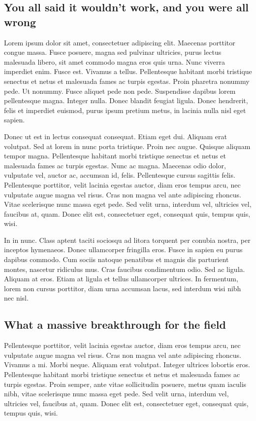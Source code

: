 \documentclass{biorxiv}
\begin{document}
\subsection{You all said it wouldn't work, and you were all wrong}
Lorem ipsum dolor sit amet, consectetuer adipiscing elit. Maecenas porttitor
congue massa. Fusce posuere, magna sed pulvinar ultricies, purus lectus
malesuada libero, sit amet commodo magna eros quis urna. Nunc viverra
imperdiet enim. Fusce est. Vivamus a tellus. Pellentesque habitant morbi
tristique senectus et netus et malesuada fames ac turpis egestas. Proin
pharetra nonummy pede. Ut nonummy. Fusce aliquet pede non pede. Suspendisse
dapibus lorem pellentesque magna. Integer nulla. Donec blandit feugiat ligula.
Donec hendrerit, felis et imperdiet euismod, purus ipsum pretium metus, in
lacinia nulla nisl eget sapien.

Donec ut est in lectus consequat consequat. Etiam eget dui. Aliquam erat
volutpat. Sed at lorem in nunc porta tristique. Proin nec augue. Quisque
aliquam tempor magna. Pellentesque habitant morbi tristique senectus et netus
et malesuada fames ac turpis egestas. Nunc ac magna. Maecenas odio dolor,
vulputate vel, auctor ac, accumsan id, felis. Pellentesque cursus sagittis
felis. Pellentesque porttitor, velit lacinia egestas auctor, diam eros tempus
arcu, nec vulputate augue magna vel risus. Cras non magna vel ante adipiscing
rhoncus. Vitae scelerisque nunc massa eget pede. Sed velit urna, interdum vel,
ultricies vel, faucibus at, quam. Donec elit est, consectetuer eget, consequat
quis, tempus quis, wisi.

In in nunc. Class aptent taciti sociosqu ad litora torquent per conubia
nostra, per inceptos hymenaeos. Donec ullamcorper fringilla eros. Fusce in
sapien eu purus dapibus commodo. Cum sociis natoque penatibus et magnis dis
parturient montes, nascetur ridiculus mus. Cras faucibus condimentum odio. Sed
ac ligula. Aliquam at eros. Etiam at ligula et tellus ullamcorper ultrices. In
fermentum, lorem non cursus porttitor, diam urna accumsan lacus, sed interdum
wisi nibh nec nisl.

\subsection{What a massive breakthrough for the field}
Pellentesque porttitor, velit lacinia egestas auctor, diam eros tempus arcu,
nec vulputate augue magna vel risus. Cras non magna vel ante adipiscing
rhoncus. Vivamus a mi. Morbi neque. Aliquam erat volutpat. Integer ultrices
lobortis eros. Pellentesque habitant morbi tristique senectus et netus et
malesuada fames ac turpis egestas. Proin semper, ante vitae sollicitudin
posuere, metus quam iaculis nibh, vitae scelerisque nunc massa eget pede. Sed
velit urna, interdum vel, ultricies vel, faucibus at, quam. Donec elit est,
consectetuer eget, consequat quis, tempus quis, wisi.
\end{document}
